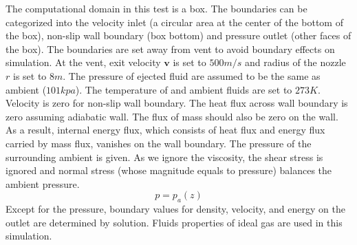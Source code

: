 The computational domain in this test is a box. The boundaries can be categorized into the velocity inlet (a circular area at the center of the bottom of the box), non-slip wall boundary (box bottom) and pressure outlet (other faces of the box). The boundaries are set away from vent to avoid boundary effects on simulation.
At the vent, exit velocity $\textbf{v}$ is set to $500 m / s$ and radius of the nozzle $r$ is set to $8m $. The pressure of ejected fluid are assumed to be the same as ambient ($101 kpa$). The temperature of and ambient fluids are set to $273 K$. 
Velocity is zero for non-slip wall boundary. The heat flux across wall boundary is zero assuming adiabatic wall. The flux of mass should also be zero on the wall. As a result, internal energy flux, which consists of heat flux and energy flux carried by mass flux, vanishes on the wall boundary. 
The pressure of the surrounding ambient is given. As we ignore the viscosity, the shear stress is ignored and normal stress (whose magnitude equals to pressure) balances the ambient pressure.
\begin{equation}
p = p_a\left(z\right)  \label{eq:pressure_bc_p} 
\end{equation} 
Except for the pressure, boundary values for density, velocity, and energy on the outlet are determined by solution. Fluids properties of ideal gas are used in this simulation.

